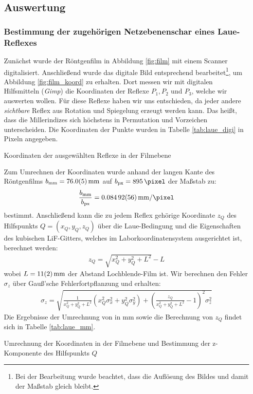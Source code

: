 \documentclass[11pt, a4paper]{article}
\begin{document}
\subsection{Auswertung}

\subsubsection{Bestimmung der zugehörigen Netzebenenschar eines Laue-Reflexes}
Zunächst wurde der Röntgenfilm in Abbildung \ref{fig:film} mit einem Scanner digitalisiert.
Anschließend wurde das digitale Bild entsprechend bearbeitet\footnote{Bei der Bearbeitung wurde beachtet, dass die Auflösung des Bildes und damit der Maßstab gleich bleibt.}, um Abbildung \ref{fig:film_koord} zu erhalten.
Dort messen wir mit digitalen Hilfsmitteln (\emph{Gimp}) die Koordinaten der Reflexe $P_1, P_2$ und $P_3$, welche wir auswerten wollen.
Für diese Reflexe haben wir uns entschieden, da jeder andere \emph{sichtbare} Reflex aus Rotation und Spiegelung erzeugt werden kann.
Das heißt, dass die Millerindizes sich höchstens in Permutation und Vorzeichen unterscheiden.
Die Koordinaten der Punkte wurden in Tabelle \ref{tab:laue_digi} in Pixeln angegeben.
\begin{table}[h]
\centering

\caption{Koordinaten der ausgewählten Reflexe in der Filmebene}
\label{tab:laue_digi}
\end{table}

Zum Umrechnen der Koordinaten wurde anhand der langen Kante des Röntgenfilms $b_\mathrm{mm} = \SI{76 +- 0.5}{\milli\metre}$ auf $b_\mathrm{px} = \SI{895}{\pixel}$ der Maßstab zu:
\begin{align}
  \frac{b_\mathrm{mm}}{b_\mathrm{px}} = \SI{0.08492 +- 0.00056}{\milli\metre\per\pixel}
\end{align}
bestimmt.
Anschließend kann die zu jedem Reflex gehörige Koordinate $z_Q$ des Hilfspunkts $Q = (x_Q, y_Q, z_Q)$ über die Laue-Bedingung und die Eigenschaften des kubischen LiF-Gitters, welches im Laborkoordinatensystem ausgerichtet ist, berechnet werden:
\begin{align}
  z_Q = \sqrt{x_Q^2 + y_Q^2 + L^2} - L
\end{align}
wobei $L = \SI{11 +- 2}{\milli\metre}$ der Abstand Lochblende-Film ist.
Wir berechnen den Fehler $\sigma_z$ über Gauß'sche Fehlerfortpflanzung und erhalten:
\begin{align}
  \sigma_z = \sqrt{ \frac{1}{x_Q^2 + y_Q^2 + L^2} \left( x_Q^2  \sigma_x^2 + y_Q^2 \sigma_y^2 \right) + \left( \frac{z_Q}{x_Q^2 + y_Q^2 + L^2}-1\right)^2 \sigma_z^2}
\end{align}
Die Ergebnisse der Umrechnung von \si{\pixel} in \si{\milli\metre} sowie die Berechnung von $z_Q$ findet sich in Tabelle \ref{tab:laue_mm}.
\begin{table}[h]
\centering

\caption{Umrechnung der Koordinaten in der Filmebene und Bestimmung der z-Komponente des Hilfspunkts $Q$}
\label{tab:laue_mm}
\end{table}
\end{document}
